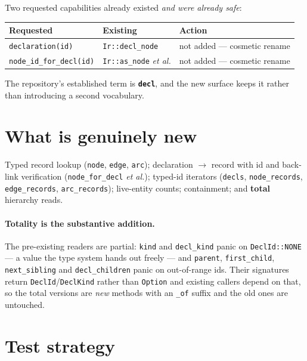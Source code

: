 \documentclass[11pt,a4paper]{article}
\newcommand{\code}[1]{\texttt{#1}}
\begin{document}
Two requested capabilities already existed \emph{and were already safe}:

\begin{center}
\begin{tabular}{@{}lll@{}}
\toprule
\textbf{Requested} & \textbf{Existing} & \textbf{Action} \\
\midrule
\code{declaration(id)} & \code{Ir::decl\_node} & not added --- cosmetic rename \\
\code{node\_id\_for\_decl(id)} & \code{Ir::as\_node} \emph{et al.} & not added --- cosmetic rename \\
\bottomrule
\end{tabular}
\end{center}

\noindent
The repository's established term is \textbf{\code{decl}}, and the new surface
keeps it rather than introducing a second vocabulary.

\section{What is genuinely new}

Typed record lookup (\code{node}, \code{edge}, \code{arc}); declaration
$\rightarrow$ record with id and back-link verification
(\code{node\_for\_decl} \emph{et al.}); typed-id iterators (\code{decls},
\code{node\_records}, \code{edge\_records}, \code{arc\_records}); live-entity
counts; containment; and \textbf{total} hierarchy reads.

\paragraph{Totality is the substantive addition.} The pre-existing readers are
partial: \code{kind} and \code{decl\_kind} panic on \code{DeclId::NONE} --- a
value the type system hands out freely --- and \code{parent},
\code{first\_child}, \code{next\_sibling} and \code{decl\_children} panic on
out-of-range ids. Their signatures return \code{DeclId}/\code{DeclKind} rather
than \code{Option} and existing callers depend on that, so the total versions
are \emph{new} methods with an \code{\_of} suffix and the old ones are untouched.

\section{Test strategy}
\end{document}
